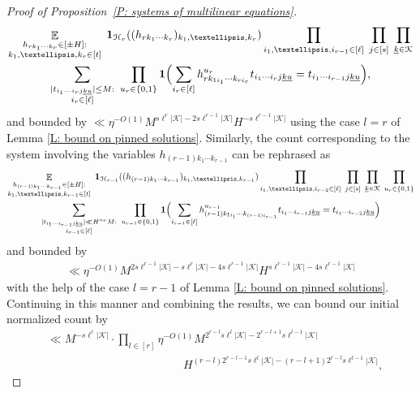 \documentclass[11pt]{amsart}
\theoremstyle{definition}
\DeclareMathOperator*{\E}{\mathbb{E}}
\newcommand{\CH}{{\mathcal H}}
\newcommand{\CK}{{\mathcal K}}
\newcommand{\uk}{{\underline{k}}}
\newcommand{\uu}{{\underline{u}}}
\newcommand{\Bigbrac}[1]{\Bigl( #1 \Bigr)}
\begin{document}
\begin{proof}[Proof of Proposition~\ref{P: systems of multilinear equations}]
    \begin{multline*}
\E_{\substack{h_{rk_1\cdots k_r}\in[\pm H]:\\ k_1,\ldots, k_r\in[t]}}\; \mathbf{1}_{\CH_r}((h_{r k_1 \cdots k_r})_{k_1, \ldots, k_r})  \prod_{i_1,\ldots, i_{r-1}\in[\ell]}\; \prod_{j\in[s]}\; \prod_{\substack{\uk\in\CK}}\\
        \sum_{\substack{|t_{i_1\cdots i_r j\uk\uu}|\leq M:\\ i_r\in[\ell]}}\ 
        \prod_{\substack{u_r\in\{0,1\}}}
         \mathbf{1}\Bigbrac{\sum\limits_{i_r\in[\ell]} h_{rk_{1i_1}\cdots k_{r i_r}}^{u_r}t_{i_1 \cdots i_r j\uk\uu} = t_{i_1 \cdots i_{r-1} j\uk\uu}},
    \end{multline*}
    and bounded by $\ll \eta^{-O(1)}M^{s\ell^{r}|\CK|-2s\ell^{r-1}|\CK|}H^{-s\ell^{r-1}|\CK|}$ using the case $l=r$ of Lemma \ref{L: bound on pinned solutions}. Similarly, the count corresponding to the system involving the variables $h_{(r-1)k_1\cdots k_{r-1}}$ can be rephrased as
    \begin{multline*}
\E_{\substack{h_{(r-1)k_1\cdots k_{r-1}}\in[\pm H]:\\ k_1,\ldots, k_{r-1}\in[t]}}\; \mathbf{1}_{\CH_{r-1}}((h_{(r-1) k_1 \cdots k_{r-1}})_{k_1, \ldots, k_{r-1}})  \prod_{i_1,\ldots, i_{r-2}\in[\ell]}\; \prod_{j\in[s]}\; \prod_{\substack{\uk\in\CK}}\; \prod_{\substack{u_{r}\in\{0,1\}}}\\
        \sum_{\substack{|t_{i_1\cdots i_{r-1} j\uk\uu}|\ll H^{u_r} M:\\ i_{r-1}\in[\ell]}}\ 
        \prod_{\substack{u_{r-1}\in\{0,1\}}}
         \mathbf{1}\Bigbrac{\sum\limits_{i_{r-1}\in[\ell]} h_{(r-1)k_{1i_1}\cdots k_{(r-1) i_{r-1}}}^{u_{r-1}}t_{i_1 \cdots i_{r-1} j\uk\uu} = t_{i_1 \cdots i_{r-2} j\uk\uu}}
    \end{multline*}  
    and bounded by
    \begin{align*}
        \ll \eta^{-O(1)}M^{2s\ell^{r-1}|\CK|-s\ell^{r}|\CK|-4s\ell^{r-1}|\CK|}H^{s\ell^{r-1}|\CK|-4s\ell^{r-1}|\CK|}
    \end{align*}
    with the help of the case $l=r-1$ of Lemma \ref{L: bound on pinned solutions}. Continuing in this manner and combining the results, we can bound our initial normalized count by
    \begin{align*}
        &\ll M^{-s\ell^r|\CK|}\cdot \prod_{l\in[r]} \eta^{-O(1)}  M^{2^{r-l}s\ell^l|\CK|-2^{r-l+1}s\ell^{l-1}|\CK|}\\ 
        &\qquad\qquad\qquad\qquad\qquad\qquad H^{(r-l)2^{r-l-1}s\ell^l|\CK| -(r-l+1)2^{r-l} s\ell^{l-1}|\CK|},

\end{align*}
\end{proof}
\end{document}
